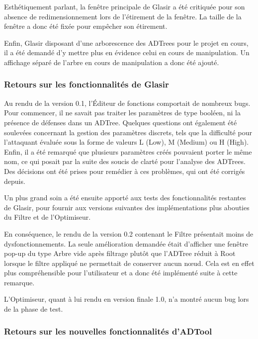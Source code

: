 Esthétiquement parlant, la fenêtre principale de Glasir a été critiquée pour son absence de redimensionnement lors de l'étirement de la fenêtre. La taille de la fenêtre a donc été fixée pour empêcher son étirement. 

Enfin, Glasir disposant d'une arborescence des ADTrees pour le projet en cours, il a été demandé d'y mettre plus en évidence celui en cours de manipulation. Un affichage séparé de l'arbre en cours de manipulation a donc été ajouté.

\subsubsection{Retours sur les fonctionnalités de Glasir}
\label{subsubsec:Glasir}

Au rendu de la version 0.1, l'Éditeur de fonctions comportait de nombreux bugs. Pour commencer, il ne savait pas traiter les paramètres de type booléen, ni la présence de défenses dans un ADTree. Quelques questions ont également été soulevées concernant la gestion des paramètres discrets, tels que la difficulté pour l'attaquant évaluée sous la forme de valeurs L (Low), M (Medium) ou H (High). Enfin, il a été remarqué que plusieurs paramètres créés pouvaient porter le même nom, ce qui posait par la suite des soucis de clarté pour l'analyse des ADTrees. Des décisions ont été prises pour remédier à ces problèmes, qui ont été corrigés depuis. 

Un plus grand soin a été ensuite apporté aux tests des fonctionnalités restantes de Glasir, pour fournir aux versions suivantes des implémentations plus abouties du Filtre et de l'Optimiseur. 

En conséquence, le rendu de la version 0.2 contenant le Filtre présentait moins de dysfonctionnements. La seule amélioration demandée était d'afficher une fenêtre pop-up du type \og Arbre vide après filtrage \fg{} plutôt que l'ADTree réduit à \og Root \fg{} lorsque le filtre appliqué ne permettait de conserver aucun n\oe{}ud. Cela est en effet plus compréhensible pour l'utilisateur et a donc été implémenté suite à cette remarque.

L'Optimiseur, quant à lui rendu en version finale 1.0, n'a montré aucun bug lors de la phase de test.

\subsubsection{Retours sur les nouvelles fonctionnalités d'ADTool}
\label{subsubsec:ADTool}

